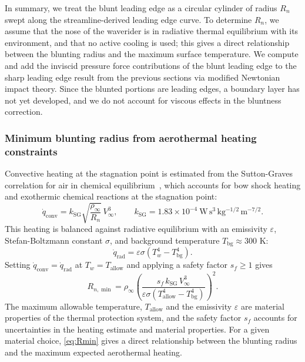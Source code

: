 \documentclass[10pt,a4paper]{article}
\begin{document}
In summary, we treat the blunt leading edge as a circular cylinder of radius $R_n$ swept along the streamline-derived leading edge curve. To determine $R_n$, we assume that the nose of the waverider is in radiative thermal equilibrium with its environment, and that no active cooling is used; this gives a direct relationship between the blunting radius and the maximum surface temperature. We compute and add the inviscid pressure force contributions of the blunt leading edge to the sharp leading edge result from the previous sections via modified Newtonian impact theory. Since the blunted portions are leading edges, a boundary layer has not yet developed, and we do not account for viscous effects in the bluntness correction.

\subsubsection{Minimum blunting radius from aerothermal heating constraints}
Convective heating at the stagnation point is estimated from the Sutton-Graves correlation for air in chemical equilibrium~\cite{Sutton:1971}, which accounts for bow shock heating and exothermic chemical reactions at the stagnation point:
\begin{equation}
    \dot{q}_{\text{conv}} = k_{\text{SG}}\sqrt{\frac{\rho_\infty}{R_n}}\,V_\infty^{3},
    \qquad k_{\text{SG}} = 1.83 \times 10^{-4}\ \mathrm{W\,s^{3}\,kg^{-1/2}\,m^{-7/2}}.
    \label{eq:sutton_graves}
\end{equation}
This heating is balanced against radiative equilibrium with an emissivity $\varepsilon$, Stefan-Boltzmann constant $\sigma$, and background temperature $T_{\text{bg}}\approx 300$ K:
\begin{equation}
    \dot{q}_{\text{rad}} = \varepsilon\sigma\!\left(T_w^{4} - T_{\text{bg}}^{4}\right).
    \label{eq:rad_eq}
\end{equation}
Setting $\dot{q}_{\text{conv}} = \dot{q}_{\text{rad}}$ at $T_w = T_{\text{allow}}$ and applying a safety factor $s_f \ge 1$ gives
\begin{equation}
    R_{n,\min}
    = \rho_\infty\!\left(
        \frac{s_f\,k_{\text{SG}}\,V_\infty^{3}}
                {\varepsilon\sigma\!\left(T_{\text{allow}}^{4}-T_{\text{bg}}^{4}\right)}
        \right)^{2}.\label{eq:Rmin}
\end{equation}
The maximum allowable temperature, $T_{\text{allow}}$ and the emissivity $\varepsilon$ are material properties of the thermal protection system, and the safety factor $s_f$ accounts for uncertainties in the heating estimate and material properties. For a given material choice, \cref{eq:Rmin} gives a direct relationship between the blunting radius and the maximum expected aerothermal heating.
\end{document}
